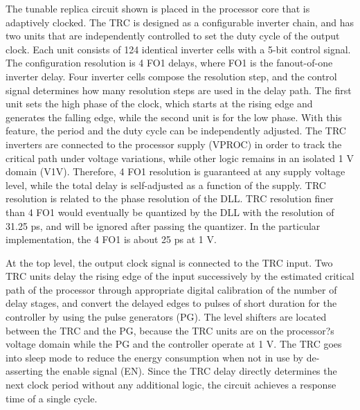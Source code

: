 \documentclass[graybox]{svmult}
\begin{document}
The tunable replica circuit shown is placed in the processor core that is adaptively clocked.
The TRC is designed as a configurable inverter chain, and has two units that are independently controlled to set the duty cycle of the output clock.
Each unit consists of 124 identical inverter cells with a 5-bit control signal.
The configuration resolution is 4 FO1 delays, where FO1 is the fanout-of-one inverter delay.
Four inverter cells compose the resolution step, and the control signal determines how many resolution steps are used in the delay path.
The first unit sets the high phase of the clock, which starts at the rising edge and generates the falling edge, while the second unit is for the low phase.
With this feature, the period and the duty cycle can be independently adjusted.
The TRC inverters are connected to the processor supply (VPROC) in order to track the critical path under voltage variations, while other logic remains in an isolated 1 V domain (V1V).
Therefore, 4 FO1 resolution is guaranteed at any supply voltage level, while the total delay is self-adjusted as a function of the supply.
TRC resolution is related to the phase resolution of the DLL.
TRC resolution finer than 4 FO1 would eventually be quantized by the DLL with the resolution of 31.25 ps, and will be ignored after passing the quantizer.
In the particular implementation, the 4 FO1 is about 25 ps at 1 V.

At the top level, the output clock signal is connected to the TRC input.
Two TRC units delay the rising edge of the input successively by the estimated critical path of the processor through appropriate digital calibration of the number of delay stages, and convert the delayed edges to pulses of short duration for the controller by using the pulse generators (PG).
The level shifters are located between the TRC and the PG, because the TRC units are on the processor?s voltage domain while the PG and the controller operate at 1 V.
The TRC goes into sleep mode to reduce the energy consumption when not in use by de-asserting the enable signal (EN).
Since the TRC delay directly determines the next clock period without any additional logic, the circuit achieves a response time of a single cycle.
\end{document}
